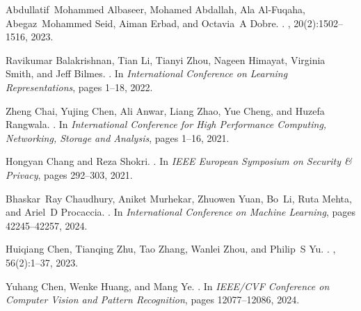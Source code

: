 \documentclass{article}
\begin{document}
\begin{thebibliography}{}

Abdullatif~Mohammed Albaseer, Mohamed Abdallah, Ala Al-Fuqaha, Abegaz~Mohammed Seid, Aiman Erbad, and Octavia~A Dobre.
.
, 20(2):1502--1516, 2023.

Ravikumar Balakrishnan, Tian Li, Tianyi Zhou, Nageen Himayat, Virginia Smith, and Jeff Bilmes.
.
\newblock In {\em {International Conference on Learning Representations}}, pages 1--18, 2022.

Zheng Chai, Yujing Chen, Ali Anwar, Liang Zhao, Yue Cheng, and Huzefa Rangwala.
.
\newblock In {\em {International Conference for High Performance Computing, Networking, Storage and Analysis}}, pages 1--16, 2021.

Hongyan Chang and Reza Shokri.
.
\newblock In {\em {IEEE European Symposium on Security \& Privacy}}, pages 292--303, 2021.

Bhaskar~Ray Chaudhury, Aniket Murhekar, Zhuowen Yuan, Bo~Li, Ruta Mehta, and Ariel~D Procaccia.
.
\newblock In {\em {International Conference on Machine Learning}}, pages 42245--42257, 2024.

Huiqiang Chen, Tianqing Zhu, Tao Zhang, Wanlei Zhou, and Philip~S Yu.
.
, 56(2):1--37, 2023.

Yuhang Chen, Wenke Huang, and Mang Ye.
.
\newblock In {\em {IEEE/CVF Conference on Computer Vision and Pattern Recognition}}, pages 12077--12086, 2024.


\end{thebibliography}
\end{document}
